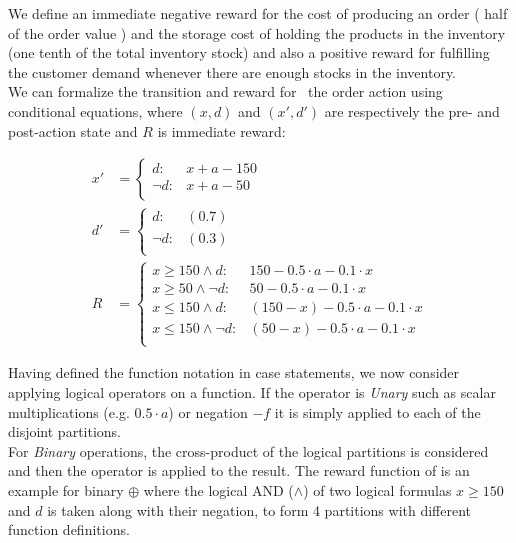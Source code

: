 \documentclass[letterpaper]{article}
\renewcommand{\-}{\text{-}}
\begin{document}
\begin{example*}[\InventoryControl]
We define an immediate negative reward for the cost of producing an order ( half of the order value ) and the storage cost of holding the products in the inventory (one tenth of the total inventory stock) and also a positive reward for fulfilling the customer demand whenever there are enough stocks in the inventory.\\
We can formalize the transition and reward for \InventoryControl\ the order action using conditional equations, where $(x,d)$ and $(x',d')$ are respectively the pre- and post-action state and $R$ is immediate reward:
\end{example*}
{\footnotesize
\begin{align*}
x' & = \begin{cases}
d     : & x + a - 150 \\
\neg d: & x + a - 50    \\
\end{cases}\\
d' & =  \begin{cases}
d     : &(0.7)\\
\neg d: &(0.3)\\
\end{cases}\\
R & = \begin{cases}
x \geq 150 \wedge d: & 150 - 0.5\cdot a - 0.1\cdot x \\
x \geq 50 \wedge \neg d: & 50 - 0.5\cdot a - 0.1\cdot x  \\
x \leq 150 \wedge d: &  (150-x)-0.5\cdot a - 0.1\cdot x \\
x \leq 150 \wedge \neg d: & (50-x)- 0.5\cdot a - 0.1\cdot x \\
\end{cases}
\end{align*}}


Having defined the function notation in case statements, we now consider applying logical operators on a function. 
If the operator is \textit{Unary} such as scalar multiplications (e.g. $0.5 \cdot a$) or negation $-f$ it is simply applied to each of the disjoint partitions. 
\\ For \textit{Binary} operations, the cross-product of the logical partitions is considered and then the operator is applied to the result. The reward function of \InventoryControl is an 
example for binary $\oplus$ where the logical AND ($\wedge$) of two logical formulas  $x \geq 150 $ and $d$ is taken along with their negation, to form 4 partitions with different function definitions. \\
\end{document}
